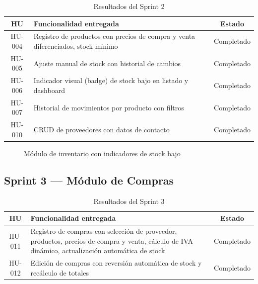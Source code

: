 \documentclass[12pt, letterpaper]{report}
\begin{document}
\begin{table}[H]
\centering
\caption{Resultados del Sprint 2}
\renewcommand{\arraystretch}{1.3}
\begin{tabularx}{\textwidth}{|c|X|c|}
\hline
\textbf{HU} & \textbf{Funcionalidad entregada} & \textbf{Estado} \\ \hline
HU-004 & Registro de productos con precios de compra y venta diferenciados, stock mínimo & Completado \\ \hline
HU-005 & Ajuste manual de stock con historial de cambios & Completado \\ \hline
HU-006 & Indicador visual (badge) de stock bajo en listado y dashboard & Completado \\ \hline
HU-007 & Historial de movimientos por producto con filtros & Completado \\ \hline
HU-010 & CRUD de proveedores con datos de contacto & Completado \\ \hline
\end{tabularx}
\end{table}

\begin{figure}[H]
\centering
{}
\caption{Módulo de inventario con indicadores de stock bajo}
\label{fig:sprint2-inventario}
\end{figure}

\subsection{Sprint 3 --- Módulo de Compras}

\begin{table}[H]
\centering
\caption{Resultados del Sprint 3}
\renewcommand{\arraystretch}{1.3}
\begin{tabularx}{\textwidth}{|c|X|c|}
\hline
\textbf{HU} & \textbf{Funcionalidad entregada} & \textbf{Estado} \\ \hline
HU-011 & Registro de compras con selección de proveedor, productos, precios de compra y venta, cálculo de IVA dinámico, actualización automática de stock & Completado \\ \hline
HU-012 & Edición de compras con reversión automática de stock y recálculo de totales & Completado \\ \hline
\end{tabularx}
\end{table}
\end{document}
